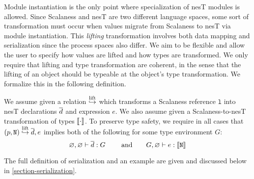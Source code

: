 Module instantiation is the only point where specialization of nesT
modules is allowed.
Since Scalaness and nesT are two different language spaces, some sort
of transformation must occur when values migrate from Scalaness to
nesT via module instantiation. This \emph{lifting} transformation
involves both data mapping and serialization since the process spaces
also differ.  We aim to be flexible and allow the user to specify how
values are lifted and how types are transformed. We only require that
lifting and type transformation are coherent, in the sense that the
lifting of an object should be typeable at the object's type
transformation.  We formalize this in the
following definition.%
\begin{definition}
\label{def-lifting}
We assume given a relation $\overset{\text{lift}}{\hookrightarrow}$ which transforms a
Scalaness reference $\texttt{l}$ into nesT declarations $\overline{d}$ and 
expression $e$.  We also assume given a Scalaness-to-nesT
transformation of types $\llbracket \cdot \rrbracket$. To preserve type safety, we
require in all cases that $\mathtt{(}p,\mathtt{N)} \overset{\text{lift}}{\hookrightarrow} \overline{d}, e$
implies both of the following for some type environment $G$:
$$
\varnothing, \varnothing \vdash \overline{d} : G \qquad \text{ and} \qquad
 G, \varnothing \vdash e : \llbracket \texttt{N} \rrbracket 
$$
\end{definition}
The full definition of serialization and an example are given and
discussed below in \autoref{section-serialization}.

\jmodsemanticsfig

